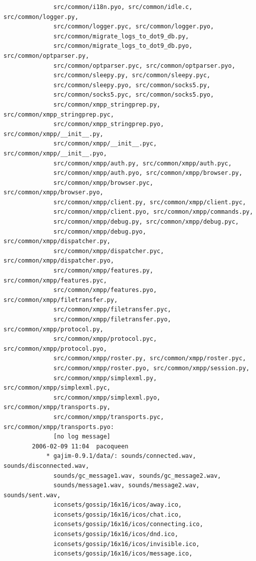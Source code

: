 \documentclass[a4paper]{article}
\begin{document}
\begin{verbatim}
              src/common/i18n.pyo, src/common/idle.c, src/common/logger.py,
              src/common/logger.pyc, src/common/logger.pyo,
              src/common/migrate_logs_to_dot9_db.py,
              src/common/migrate_logs_to_dot9_db.pyo, src/common/optparser.py,
              src/common/optparser.pyc, src/common/optparser.pyo,
              src/common/sleepy.py, src/common/sleepy.pyc,
              src/common/sleepy.pyo, src/common/socks5.py,
              src/common/socks5.pyc, src/common/socks5.pyo,
              src/common/xmpp_stringprep.py, src/common/xmpp_stringprep.pyc,
              src/common/xmpp_stringprep.pyo, src/common/xmpp/__init__.py,
              src/common/xmpp/__init__.pyc, src/common/xmpp/__init__.pyo,
              src/common/xmpp/auth.py, src/common/xmpp/auth.pyc,
              src/common/xmpp/auth.pyo, src/common/xmpp/browser.py,
              src/common/xmpp/browser.pyc, src/common/xmpp/browser.pyo,
              src/common/xmpp/client.py, src/common/xmpp/client.pyc,
              src/common/xmpp/client.pyo, src/common/xmpp/commands.py,
              src/common/xmpp/debug.py, src/common/xmpp/debug.pyc,
              src/common/xmpp/debug.pyo, src/common/xmpp/dispatcher.py,
              src/common/xmpp/dispatcher.pyc, src/common/xmpp/dispatcher.pyo,
              src/common/xmpp/features.py, src/common/xmpp/features.pyc,
              src/common/xmpp/features.pyo, src/common/xmpp/filetransfer.py,
              src/common/xmpp/filetransfer.pyc,
              src/common/xmpp/filetransfer.pyo, src/common/xmpp/protocol.py,
              src/common/xmpp/protocol.pyc, src/common/xmpp/protocol.pyo,
              src/common/xmpp/roster.py, src/common/xmpp/roster.pyc,
              src/common/xmpp/roster.pyo, src/common/xmpp/session.py,
              src/common/xmpp/simplexml.py, src/common/xmpp/simplexml.pyc,
              src/common/xmpp/simplexml.pyo, src/common/xmpp/transports.py,
              src/common/xmpp/transports.pyc, src/common/xmpp/transports.pyo:
              [no log message]
        2006-02-09 11:04  pacoqueen
            * gajim-0.9.1/data/: sounds/connected.wav, sounds/disconnected.wav,
              sounds/gc_message1.wav, sounds/gc_message2.wav,
              sounds/message1.wav, sounds/message2.wav, sounds/sent.wav,
              iconsets/gossip/16x16/icos/away.ico,
              iconsets/gossip/16x16/icos/chat.ico,
              iconsets/gossip/16x16/icos/connecting.ico,
              iconsets/gossip/16x16/icos/dnd.ico,
              iconsets/gossip/16x16/icos/invisible.ico,
              iconsets/gossip/16x16/icos/message.ico,

\end{verbatim}
\end{document}
